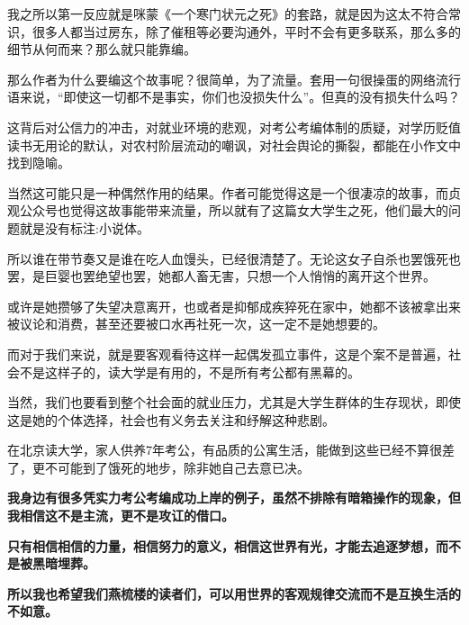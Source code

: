 \documentclass[UTF8, 11pt, oneside]{ctexart}
\begin{document}
我之所以第一反应就是咪蒙《一个寒门状元之死》的套路，就是因为这太不符合常识，很多人都当过房东，除了催租等必要沟通外，平时不会有更多联系，那么多的细节从何而来？那么就只能靠编。

那么作者为什么要编这个故事呢？很简单，为了流量。套用一句很操蛋的网络流行语来说，“即使这一切都不是事实，你们也没损失什么”。但真的没有损失什么吗？

这背后对公信力的冲击，对就业环境的悲观，对考公考编体制的质疑，对学历贬值读书无用论的默认，对农村阶层流动的嘲讽，对社会舆论的撕裂，都能在小作文中找到隐喻。

当然这可能只是一种偶然作用的结果。作者可能觉得这是一个很凄凉的故事，而贞观公众号也觉得这故事能带来流量，所以就有了这篇女大学生之死，他们最大的问题就是没有标注:小说体。

所以谁在带节奏又是谁在吃人血馒头，已经很清楚了。无论这女子自杀也罢饿死也罢，是巨婴也罢绝望也罢，她都人畜无害，只想一个人悄悄的离开这个世界。

或许是她攒够了失望决意离开，也或者是抑郁成疾猝死在家中，她都不该被拿出来被议论和消费，甚至还要被口水再社死一次，这一定不是她想要的。

而对于我们来说，就是要客观看待这样一起偶发孤立事件，这是个案不是普遍，社会不是这样子的，读大学是有用的，不是所有考公都有黑幕的。

当然，我们也要看到整个社会面的就业压力，尤其是大学生群体的生存现状，即使这是她的个体选择，社会也有义务去关注和纾解这种悲剧。

在北京读大学，家人供养7年考公，有品质的公寓生活，能做到这些已经不算很差了，更不可能到了饿死的地步，除非她自己去意已决。

\textbf{我身边有很多凭实力考公考编成功上岸的例子，虽然不排除有暗箱操作的现象，但我相信这不是主流，更不是攻讧的借口。}

\textbf{只有相信相信的力量，相信努力的意义，相信这世界有光，才能去追逐梦想，而不是被黑暗埋葬。}

\textbf{所以我也希望我们燕梳楼的读者们，可以用世界的客观规律交流而不是互换生活的不如意。}

\textbf{}

\end{document}
